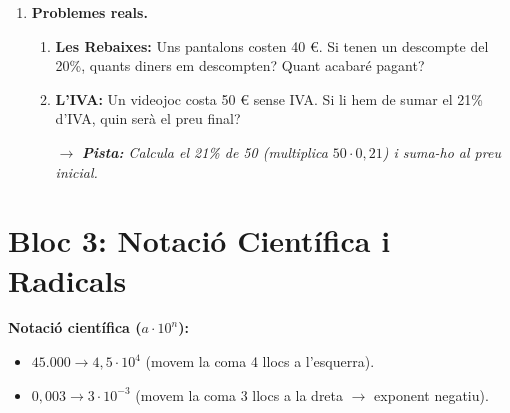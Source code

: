 \documentclass[12pt,a4paper]{article}
\newcommand{\pista}[1]{
    \par\vspace{2pt}
    {\small \color{blue!70!black} $\rightarrow$ \textit{\textbf{Pista:} #1}}
}
\begin{document}
\begin{enumerate}[resume]
    \item \textbf{Problemes reals.}
    \begin{enumerate}
        \item \textbf{Les Rebaixes:} Uns pantalons costen 40 €. Si tenen un descompte del 20\%, quants diners em descompten? Quant acabaré pagant?
        \vspace{2cm}
        
        \item \textbf{L'IVA:} Un videojoc costa 50 € sense IVA. Si li hem de sumar el 21\% d'IVA, quin serà el preu final?
        \pista{Calcula el 21\% de 50 (multiplica $50 \cdot 0,21$) i suma-ho al preu inicial.}
        \vspace{2cm}
    \end{enumerate}
\end{enumerate}

\section*{Bloc 3: Notació Científica i Radicals}

\begin{exemple}
\textbf{Notació científica ($a \cdot 10^n$):}
\begin{itemize}
    \item $45.000 \to 4,5 \cdot 10^4$ (movem la coma 4 llocs a l'esquerra).
    \item $0,003 \to 3 \cdot 10^{-3}$ (movem la coma 3 llocs a la dreta $\to$ exponent negatiu).
\end{itemize}
\end{exemple}
\end{document}
